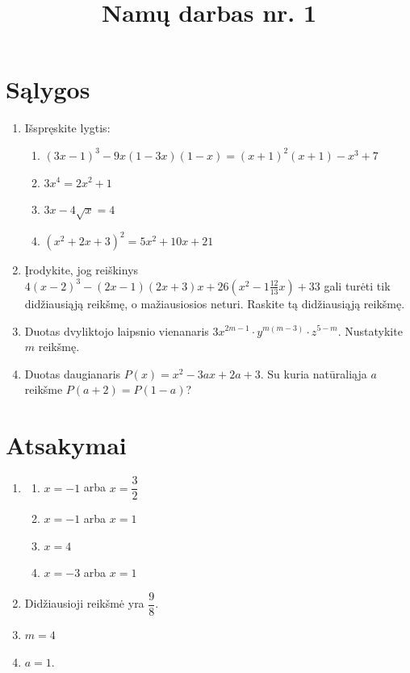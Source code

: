 \documentclass[12pt, a4paper]{article}
\title{\textbf{Namų darbas nr. 1}}
\date{}
\begin{document}
\maketitle

\section{Sąlygos}

\begin{enumerate}[label=\textbf{\arabic* užduotis.}, leftmargin=*]
    \item Išspręskite lygtis:
    \begin{enumerate}[label=\alph*)]
        \item $(3x-1)^3-9x(1-3x)(1-x)=(x+1)^2(x+1)-x ^{3}+7 $
        \item $3x^4=2x^2+1$
        \item $3x-4\sqrt{x}=4$
        \item $\left(x^2+2x+3\right)^2=5x^2+10x+21$
    \end{enumerate}

    \item Įrodykite, jog reiškinys
    $4(x-2)^3-(2x-1)(2x+3)x+26\left(x^2-1\frac{12}{13}x\right)+33$
    gali turėti tik didžiausiąją reikšmę, o mažiausiosios neturi. Raskite tą didžiausiąją reikšmę.

    \item Duotas dvyliktojo laipsnio vienanaris
    $3x^{2m-1}\cdot y^{m(m-3)}\cdot z^{5-m}$. Nustatykite $m$ reikšmę.

    \item Duotas daugianaris $P(x)=x^2-3ax+2a+3$. Su kuria natūraliąja $a$ reikšme $P(a+2)=P(1-a)$?
\end{enumerate}

\newpage

\section{Atsakymai}

\begin{enumerate}[label=\textbf{\arabic* užduotis.}, leftmargin=*]
    \item
    \begin{enumerate}[label=\alph*)]
        \item $x=-1$ arba $x=\dfrac{3}{2}$
        \item $x=-1$ arba $x=1$
        \item $x=4$
        \item $x=-3$ arba $x=1$
    \end{enumerate}
    \item  Didžiausioji reikšmė yra $\dfrac98$.
    \item $m=4$
    \item $a=1$.
\end{enumerate}
\end{document}
